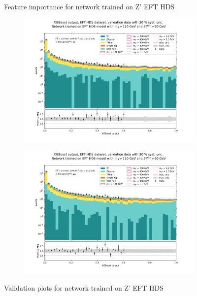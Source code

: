 \documentclass[12pt, a4paper]{book}
\begin{document}
\begin{figure}[!ht]
\begin{subfigure}[b]{0.7\textwidth}
      \end{subfigure}
   \caption{Feature importance for network trained on Z' EFT HDS}\label{fig:EFT_HDS_feat}
\end{figure}
\begin{figure}[!ht]
	\centering
	\begin{subfigure}[b]{0.49\textwidth}
      \centering
      \includegraphics[width=1\textwidth]{XGBoost/EFT_HDS/VAL_ee.pdf}
      \end{subfigure}
   \hfill
   \begin{subfigure}[b]{0.49\textwidth}
      \centering
      \includegraphics[width=1\textwidth]{XGBoost/EFT_HDS/VAL_uu.pdf}
      \end{subfigure}
   \caption{Validation plots for network trained on Z' EFT HDS}\label{fig:EFT_HDS_vals}
\end{figure}
\end{document}
